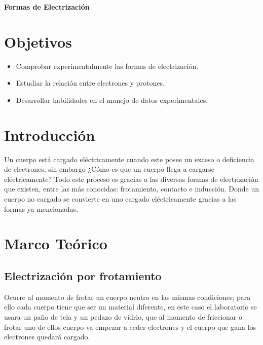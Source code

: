 \begin{center}
	{\Large \textbf{Formas de Electrización}}
\end{center}
\section{Objetivos}
\begin{itemize}
	\item Comprobar experimentalmente las formas de electrización.
	\item Estudiar la relación entre electrones y protones.
	\item Desarrollar habilidades en el manejo de datos experimentales. 
\end{itemize}

\section{Introducción}
Un cuerpo está cargado eléctricamente cuando este posee un exceso o deficiencia de electrones, sin embargo ¿Cómo es que un cuerpo llega a cargarse eléctricamente? Todo este proceso es gracias a las diversas formas de electrización que existen, entre las más conocidas: frotamiento, contacto e inducción. Donde un cuerpo no cargado se convierte en uno cargado eléctricamente gracias a las formas ya mencionadas.

\section{Marco Teórico}
\subsection{Electrización por frotamiento}
Ocurre al momento de frotar un cuerpo neutro en las mismas condiciones; para ello cada cuerpo tiene que ser un material diferente, en este caso el laboratorio se usara un paño de tela y un pedazo de vidrio, que al momento de friccionar o frotar  uno de ellos cuerpo va empezar a ceder electrones y el cuerpo que gana los electrones quedará cargado.

